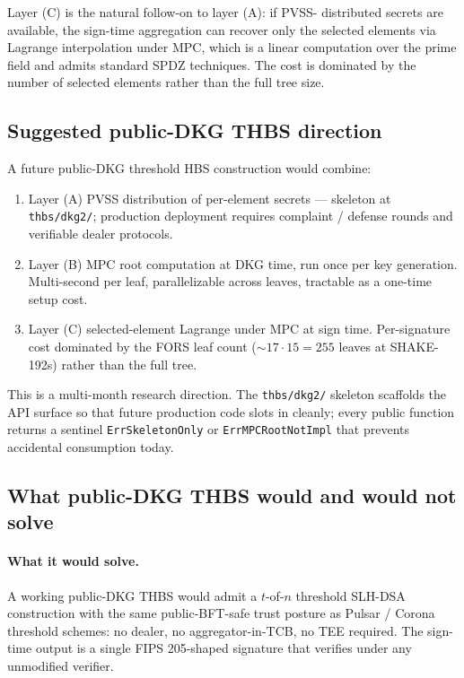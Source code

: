 Layer (C) is the natural follow-on to layer (A): if PVSS-
distributed secrets are available, the sign-time aggregation can
recover only the selected elements via Lagrange interpolation
under MPC, which is a linear computation over the prime field
and admits standard SPDZ techniques. The cost is dominated by
the number of selected elements rather than the full tree size.

\subsection{Suggested public-DKG THBS direction}
\label{sec:fullmpc:direction}

A future public-DKG threshold HBS construction would combine:
\begin{enumerate}[leftmargin=2em,nosep]
  \item Layer (A) PVSS distribution of per-element secrets ---
        skeleton at \texttt{thbs/dkg2/}; production deployment
        requires complaint / defense rounds and verifiable
        dealer protocols.
  \item Layer (B) MPC root computation at DKG time, run once per
        key generation. Multi-second per leaf, parallelizable
        across leaves, tractable as a one-time setup cost.
  \item Layer (C) selected-element Lagrange under MPC at sign
        time. Per-signature cost dominated by the FORS leaf
        count ($\sim 17 \cdot 15 = 255$ leaves at SHAKE-192s)
        rather than the full tree.
\end{enumerate}

This is a multi-month research direction. The \texttt{thbs/dkg2/}
skeleton scaffolds the API surface so that future production code
slots in cleanly; every public function returns a sentinel
\texttt{ErrSkeletonOnly} or \texttt{ErrMPCRootNotImpl} that
prevents accidental consumption today.

\subsection{What public-DKG THBS would and would not solve}
\label{sec:fullmpc:limits}

\paragraph{What it would solve.} A working public-DKG THBS would
admit a $t$-of-$n$ threshold SLH-DSA construction with the same
public-BFT-safe trust posture as Pulsar / Corona threshold
schemes: no dealer, no aggregator-in-TCB, no TEE required. The
sign-time output is a single FIPS 205-shaped signature that
verifies under any unmodified verifier.

